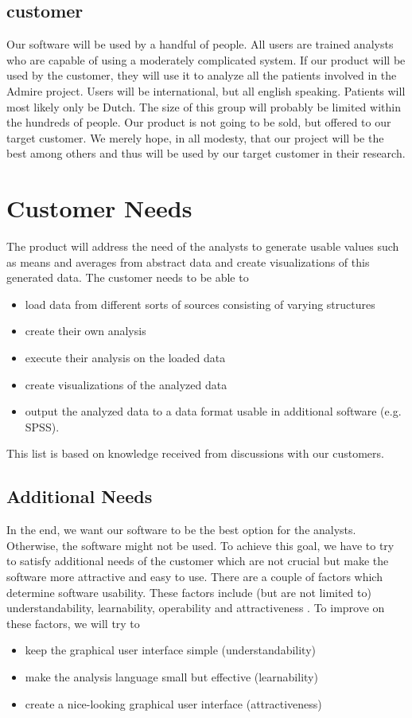 \documentclass[a4paper]{article}
\begin{document}
\subsection{customer}
Our software will be used by a handful of people. All users are trained analysts who are capable of using a moderately complicated system. If our product will be used by the customer, they will use it to analyze all the patients involved in the Admire project. Users will be international, but all english speaking. Patients will most likely only be Dutch. The size of this group will probably be limited within the hundreds of people. Our product is not going to be sold, but offered to our target customer. We merely hope, in all modesty, that our project will be the best among others and thus will be used by our target customer in their research. 

\section{Customer Needs}
The product will address the need of the analysts to generate usable values such as means and averages from abstract data and create visualizations of this generated data. The customer needs to be able to 
\begin{itemize}
\item load data from different sorts of sources consisting of varying structures 
\item create their own analysis 
\item execute their analysis on the loaded data
\item create visualizations of the analyzed data
\item output the analyzed data to a data format usable in additional software (e.g. SPSS).
\end{itemize}
This list is based on knowledge received from discussions with our customers. 

\subsection{Additional Needs}
In the end, we want our software to be the best option for the analysts. Otherwise, the software might not be used. To achieve this goal, we have to try to satisfy additional needs of the customer which are not crucial but make the software more attractive and easy to use. There are a couple of factors which determine software usability. These factors include (but are not limited to) understandability, learnability, operability and attractiveness \cite{komiyama}. To improve on these factors, we will try to 
\begin{itemize}
\item keep the graphical user interface simple (understandability) 
\item make the analysis language small but effective (learnability)
\item create a nice-looking graphical user interface (attractiveness) 
\end{itemize}
\end{document}
